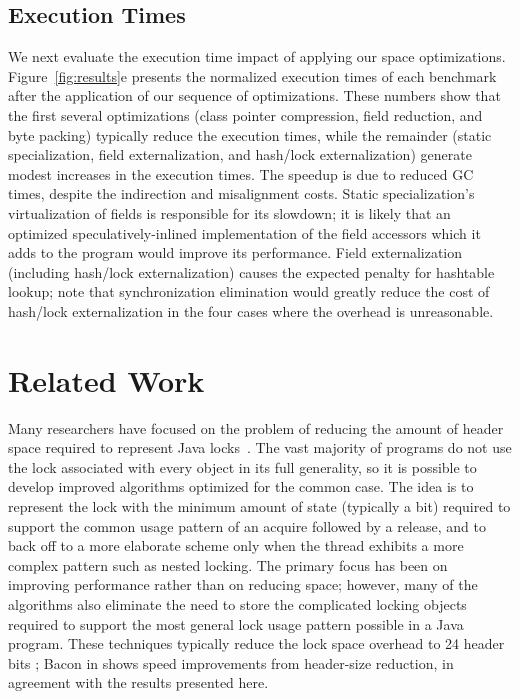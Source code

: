 \documentclass{acmconf}
\begin{document}
\subsection{Execution Times} 
\label{sec:byte-pack}
%
We next evaluate the execution time impact of applying our space
optimizations. Figure~\ref{fig:results}e presents the normalized execution 
times of each benchmark after the application of our sequence
of optimizations. These numbers show that the first several
optimizations (class pointer compression, field reduction, and byte packing)
typically reduce the execution times, while the
remainder (static specialization, field externalization, and  hash/lock
externalization) generate modest increases in the execution times.
The speedup is due to reduced GC times, despite the indirection and
misalignment costs.
Static specialization's virtualization of fields is responsible for
its slowdown; it is likely that an optimized speculatively-inlined
implementation of the field accessors which it adds to the program
would improve its performance.  Field externalization (including
hash/lock externalization) causes the expected penalty for hashtable
lookup; note that synchronization elimination would greatly reduce the
cost of hash/lock externalization in the four cases where the overhead
is unreasonable.
%
%
\section{Related Work}
%
Many researchers have focused on the problem of reducing the amount of
header space required to represent Java
locks~\cite{bacon98,OK99,ADGKRW99}. The vast
majority of programs do not use the lock associated with every object
in its full generality, so it is possible to develop improved
algorithms optimized for the common case.
The idea is to represent the lock with the minimum amount
of state (typically a bit) required to support the common usage
pattern of an acquire followed by a release,
and to back off to a more elaborate scheme only when the thread
exhibits a more complex pattern such as nested locking. The
primary focus has been on improving performance rather than on
reducing space; however, many of the algorithms also eliminate the
need to store the complicated locking objects required to support the
most general lock usage pattern possible in a Java program. These
techniques typically reduce the lock space overhead to 24 header bits
\cite{bacon98}; Bacon in \cite{bacon02:efficient} shows speed
improvements from header-size reduction, in agreement with the results
presented here.
\end{document}
